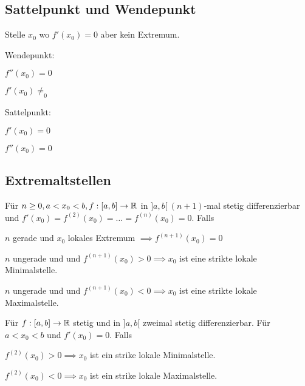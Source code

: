 \subsection{Sattelpunkt und Wendepunkt}
Stelle $x_0$ wo $f'(x_0)=0$ aber kein Extremum.
\begin{compactdesc}
    \item[Wendepunkt:]
        \begin{inparaitem}
            \item $f''(x_0)=0$
            \item $f'(x_0)\neq_0$
        \end{inparaitem}
    \item[Sattelpunkt:]
        \begin{inparaitem}
            \item $f'(x_0) = 0$
            \item $f''(x_0) = 0$
        \end{inparaitem}
\end{compactdesc}

\subsection{Extremaltstellen}
Für $n \ge 0, a < x_0 < b, f:[a,b] \to \mathbb{R}$ in $]a,b[ \ (n+1)$-mal stetig differenzierbar und $f'(x_0) = f^{(2)}(x_0) = \dots = f^{(n)}(x_0) = 0$. Falls
\begin{compactenum}
    \item $n$ gerade und $x_0$ lokales Extremum $\implies f^{(n+1)}(x_0) = 0$
    \item $n$ ungerade und und $f^{(n+1)}(x_0) > 0 \implies x_0$ ist eine strikte lokale Minimalstelle.
    \item $n$ ungerade und und $f^{(n+1)}(x_0) < 0 \implies x_0$ ist eine strikte lokale Maximalstelle.
\end{compactenum}

Für $f:[a,b] \to \mathbb{R}$ stetig und in $]a,b[$ zweimal stetig differenzierbar. Für $a < x_0 < b$ und $f'(x_0) = 0$. Falls
\begin{compactenum}
    \item $f^{(2)}(x_0) > 0 \implies x_0$ ist ein strike lokale Minimalstelle.
    \item $f^{(2)}(x_0) < 0 \implies x_0$ ist ein strike lokale Maximalstelle.
\end{compactenum}

